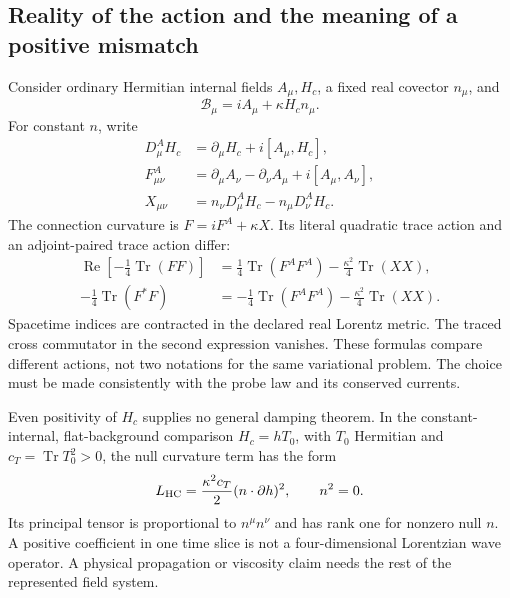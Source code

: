 \documentclass[11pt,a4paper]{article}
\begin{document}
\subsection{Reality of the action and the meaning of a positive mismatch}
Consider ordinary Hermitian internal fields $A_\mu,H_c$, a fixed real
covector $n_\mu$, and
\begin{equation}
 \mathcal B_\mu=iA_\mu+\kappa H_cn_\mu.
\end{equation}
For constant $n$, write
\begin{align}
 D_\mu^AH_c&=\partial_\mu H_c+i[A_\mu,H_c],\\
 F^A_{\mu\nu}&=\partial_\mu A_\nu-\partial_\nu A_\mu
                                      +i[A_\mu,A_\nu],\\
 X_{\mu\nu}&=n_\nu D_\mu^AH_c-n_\mu D_\nu^AH_c.
\end{align}
The connection curvature is $F=iF^A+\kappa X$. Its literal quadratic
trace action and an adjoint-paired trace action differ:
\begin{align}
 \operatorname{Re}\left[-\tfrac14\operatorname{Tr}(FF)\right]
 &=\tfrac14\operatorname{Tr}(F^AF^A)
          -\tfrac{\kappa^2}{4}\operatorname{Tr}(XX),\\
 -\tfrac14\operatorname{Tr}(F^*F)
 &=-\tfrac14\operatorname{Tr}(F^AF^A)
          -\tfrac{\kappa^2}{4}\operatorname{Tr}(XX).
\end{align}
Spacetime indices are contracted in the declared real Lorentz metric.
The traced cross commutator in the second expression vanishes.
These formulas compare different actions, not two notations for the
same variational problem. The choice must be made consistently with
the probe law and its conserved currents.

Even positivity of $H_c$ supplies no general damping theorem. In
the constant-internal, flat-background comparison $H_c=hT_0$, with
$T_0$ Hermitian and $c_T=\operatorname{Tr}T_0^2>0$, the null
curvature term has the form
\begin{equation}
 L_{\rm HC}=\frac{\kappa^2c_T}{2}(n\cdot\partial h)^2,
 \qquad n^2=0.
\end{equation}
Its principal tensor is proportional to $n^\mu n^\nu$ and has
rank one for nonzero null $n$. A positive coefficient in one time
slice is not a four-dimensional Lorentzian wave operator. A physical
propagation or viscosity claim needs the rest of the represented
field system.
\end{document}
